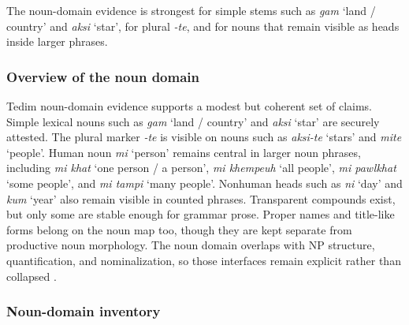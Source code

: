 \documentclass[
  11pt,
  a4paper,
]{article}
\newcommand{\tdim}[1]{\textit{#1}}
\newcommand{\glossquote}[1]{`#1'}
\begin{document}
The noun-domain evidence is strongest for simple stems such as
\tdim{gam} \glossquote{land / country} and \tdim{aksi}
\glossquote{star}, for plural \tdim{-te}, and for nouns that remain
visible as heads inside larger phrases.

\subsubsection{Overview of the noun
domain}\label{overview-of-the-noun-domain}

Tedim noun-domain evidence supports a modest but coherent set of claims.
Simple lexical nouns such as \tdim{gam} \glossquote{land / country} and
\tdim{aksi} \glossquote{star} are securely attested. The plural marker
\tdim{-te} is visible on nouns such as \tdim{aksi-te} \glossquote{stars}
and \tdim{mite} \glossquote{people}. Human noun \tdim{mi}
\glossquote{person} remains central in larger noun phrases, including
\tdim{mi khat} \glossquote{one person / a person}, \tdim{mi khempeuh}
\glossquote{all people}, \tdim{mi pawlkhat} \glossquote{some people},
and \tdim{mi tampi} \glossquote{many people}. Nonhuman heads such as
\tdim{ni} \glossquote{day} and \tdim{kum} \glossquote{year} also remain
visible in counted phrases. Transparent compounds exist, but only some
are stable enough for grammar prose. Proper names and title-like forms
belong on the noun map too, though they are kept separate from
productive noun morphology. The noun domain overlaps with NP structure,
quantification, and nominalization, so those interfaces remain explicit
rather than collapsed \citep{henderson1965, zamngaihcing2017}.

\subsubsection{Noun-domain inventory}\label{noun-domain-inventory}
\end{document}

